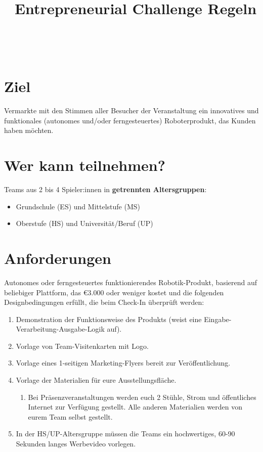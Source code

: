 \documentclass[a4paper,12pt]{article}
\begin{document}



\title{\tagYear\ Entrepreneurial Challenge Regeln}

\makeatletter
\let\inserttitle\@title
\makeatother
\begin{center}
	\rrgerLogo
	\huge                      %
	\bfseries                   %
	\\
	\inserttitle
\end{center}

\section{Ziel}
Vermarkte mit den Stimmen aller Besucher der Veranstaltung ein innovatives und
funktionales (autonomes und/oder ferngesteuertes) Roboterprodukt, das Kunden
haben möchten.

\section{Wer kann teilnehmen?}
Teams aus 2 bis 4 Spieler:innen in \textbf{getrennten Altersgruppen}:

\begin{itemize}
	\item Grundschule (ES) und Mittelstufe (MS)
	\item Oberstufe (HS) und Universität/Beruf (UP)
\end{itemize}
\combineDivisions
\declareExhibition

\section{Anforderungen}
Autonomes oder ferngesteuertes funktionierendes Robotik-Produkt, basierend auf
beliebiger Plattform, das \euro{3.000} oder weniger kostet und die folgenden
Designbedingungen erfüllt, die beim Check-In überprüft werden:
\begin{enumerate}
	\item Demonstration der Funktionsweise des Produkts (weist eine
		Eingabe-Verarbeitung-Ausgabe-Logik auf).
	\item Vorlage von Team-Visitenkarten mit Logo.
	\item Vorlage eines 1-seitigen Marketing-Flyers bereit zur
		Veröffentlichung.
	\item Vorlage der Materialien für eure Ausstellungsfläche.
	\begin{enumerate}
		\item Bei Präsenzveranstaltungen werden euch 2 Stühle, Strom
			und öffentliches Internet zur Verfügung gestellt.
			Alle anderen Materialien werden von eurem Team selbst
			gestellt.
	\end{enumerate}
	\item In der HS/UP-Altersgruppe müssen die Teams ein hochwertiges,
		60-90 Sekunden langes Werbevideo vorlegen.
\end{enumerate}
\end{document}
